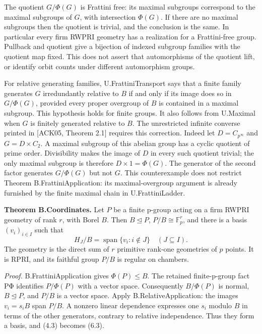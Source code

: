 \documentclass[
  11pt,
  a4paper,
]{article}
\begin{document}
The quotient \(G/\Phi(G)\) is Frattini free: its maximal subgroups
correspond to the maximal subgroups of \(G\), with intersection
\(\Phi(G)\). If there are no maximal subgroups then the quotient is
trivial, and the conclusion is the same. In particular every firm RWPRI
geometry has a realization for a Frattini-free group. Pullback and
quotient give a bijection of indexed subgroup families with the quotient
map fixed. This does not assert that automorphisms of the quotient lift,
or identify orbit counts under different automorphism groups.

For relative generating families, U.FrattiniTransport says that a finite
family generates \(G\) irredundantly relative to \(B\) if and only if
its image does so in \(G/\Phi(G)\), provided every proper overgroup of
\(B\) is contained in a maximal subgroup. This hypothesis holds for
finite groups. It also follows from U.Maximal when \(G\) is finitely
generated relative to \(B\). The unrestricted infinite converse printed
in {[}ACK05, Theorem 2.1{]} requires this correction. Indeed let
\(D=C_{p^\infty}\) and \(G=D\times C_2\). A maximal subgroup of this
abelian group has a cyclic quotient of prime order. Divisibility makes
the image of \(D\) in every such quotient trivial; the only maximal
subgroup is therefore \(D\times1=\Phi(G)\). The generator of the second
factor generates \(G/\Phi(G)\) but not \(G\). This counterexample does
not restrict Theorem B.FrattiniApplication: its maximal-overgroup
argument is already furnished by the finite maximal chain in
U.FrattiniLadder.

\textbf{Theorem B.Coordinates.} Let \(P\) be a finite p-group acting on
a firm RWPRI geometry of rank \(r\), with Borel \(B\). Then
\(B\unlhd P\), \(P/B\cong\mathbb F_p^r\), and there is a basis
\((v_i)_{i\in I}\) such that \[
H_J/B=\operatorname{span}\{v_i:i\notin J\}\quad(J\subseteq I).
\tag{6.3}
\] The geometry is the direct sum of \(r\) primitive rank-one geometries
of \(p\) points. It is RPRI, and its faithful group \(P/B\) is regular
on chambers.

\emph{Proof.} B.FrattiniApplication gives \(\Phi(P)\leq B\). The
retained finite-p-group fact PΦ identifies \(P/\Phi(P)\) with a vector
space. Consequently \(B/\Phi(P)\) is normal, \(B\unlhd P\), and \(P/B\)
is a vector space. Apply B.RelativeApplication: the images \(v_i=s_iB\)
span \(P/B\). A nonzero linear dependence expresses one \(s_i\) modulo
\(B\) in terms of the other generators, contrary to relative
independence. Thus they form a basis, and (4.3) becomes (6.3).
\end{document}
